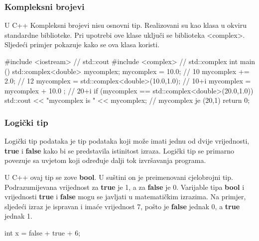 \documentclass[11pt]{book}
\begin{document}

\subsubsection {Kompleksni brojevi}
U C++ Kompleksni brojevi nisu osnovni tip. Realizovani su kao klasa u okviru standardne biblioteke. Pri upotrebi ove klase uključi se biblioteka <complex>. Sljedeći primjer pokazuje kako se ova klasa koristi.

\begin{shortlisting}
  #include <iostream>     // std::cout
  #include <complex>      // std::complex
  int main ()
    {
      std::complex<double> mycomplex;
      mycomplex = 10.0;   // 10
      mycomplex += 2.0;   // 12
      mycomplex = std::complex<double>(10.0,1.0);  // 10+i
      mycomplex = mycomplex + 10.0 ;               // 20+i
      if (mycomplex == std::complex<double>(20.0,1.0))
      std::cout << "mycomplex is " << mycomplex; // mycomplex je (20,1)
      return 0;
    }
\end{shortlisting}

\subsubsection {Logički tip}

Logički tip podataka je tip podataka koji može imati jednu od dvije vrijednosti, \textbf{true} i \textbf{false} kako bi se predstavila istinitost izraza. Logički tip se primarno povezuje sa uvjetom koji određuje dalji tok izvršavanja programa.

U C++ ovaj tip se zove \textbf{bool}. U suštini on je preimenovani cjelobrojni tip. Podrazumijevana vrijednost za \textbf{true} je 1, a za \textbf{false} je 0. Varijable tipa \textbf{bool} i vrijednosti \textbf{true} i \textbf{false} mogu se javljati u matematičkim izrazima. Na primjer, sljedeći izraz je ispravan i imaće vrijednost 7, pošto je \textbf{false} jednak 0, a \textbf{true} jednak 1.

\begin{shortlisting}
  int x = false + true + 6;
\end{shortlisting}
\end{document}
